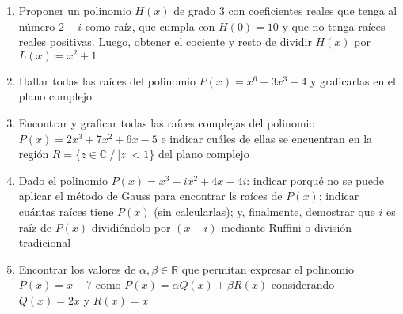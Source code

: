 \documentclass[a4paper]{article}
\begin{document}
\begin{enumerate}
\begin{enumerate} [label=(\alph*)]
		\item Proponer un polinomio $H(x)$ de grado 3 con coeficientes reales que tenga al número $2-i$ como raíz, que cumpla con $H(0)=10$ y que no tenga raíces reales positivas. Luego, obtener el cociente y resto de dividir $H(x)$ por $L(x)=x^2+1$
		\item Hallar todas las raíces del polinomio $P(x)=x^6-3x^3-4$ y graficarlas en el plano complejo
		\item Encontrar y graficar todas las raíces complejas del polinomio $P(x)=2x^3+7x^2+6x-5$ e indicar cuáles de ellas se encuentran en la región $R=\{ z \in \mathbb{C} ~/~ |z|<1 \}$ del plano complejo
		\item Dado el polinomio $P(x)=x^3-ix^2+4x-4i$: indicar porqué no se puede aplicar el método de Gauss para encontrar ls raíces de $P(x)$; indicar cuántas raíces tiene $P(x)$ (sin calcularlas); y, finalmente, demostrar que $i$ es raíz de $P(x)$ dividiéndolo por $(x-i)$ mediante Ruffini o división tradicional
		\item Encontrar los valores de $\alpha, \beta \in \mathbb{R}$ que permitan expresar el polinomio $P(x)=x-7$ como $P(x)=\alpha Q(x)+\beta R(x)$ considerando $Q(x)=2x$ y $R(x)=x$
	\end{enumerate}
\end{enumerate}
\vspace{20pt} 
\end{document}
